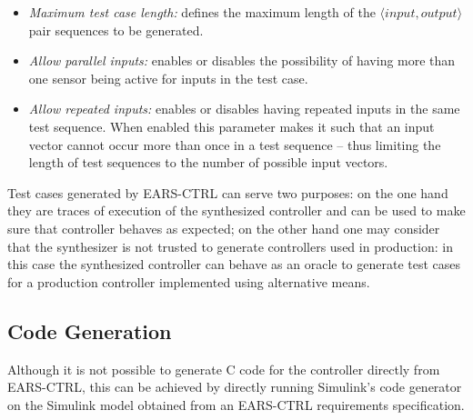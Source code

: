 \begin{itemize}
  \item \emph{Maximum test case length:} defines the maximum length of the
  $\langle input, output \rangle$ pair sequences to be generated.
  \item \emph{Allow parallel inputs:} enables or disables the possibility of
  having more than one sensor being active for inputs in the test case.
  \item \emph{Allow repeated inputs:} enables or disables having repeated inputs
  in the same test sequence. When enabled this parameter makes it such that
  an input vector cannot occur more than once in a test sequence -- thus
  limiting the length of test sequences to the number of possible input vectors.
\end{itemize}

Test cases generated by \textsf{EARS-CTRL} can serve two purposes: on
the one hand they are traces of execution of the synthesized controller and can
be used to make sure that controller behaves as expected; on the other hand one
may consider that the synthesizer is not trusted to generate controllers used in
production: in this case the synthesized controller can behave as an oracle to
generate test cases for a production controller implemented using alternative
means.

\subsection{Code Generation}

Although it is not possible to generate C code for the controller directly from
\textsf{EARS-CTRL}, this can be achieved by directly running Simulink's code
generator on the Simulink model obtained from an \textsf{EARS-CTRL} requirements
specification.
